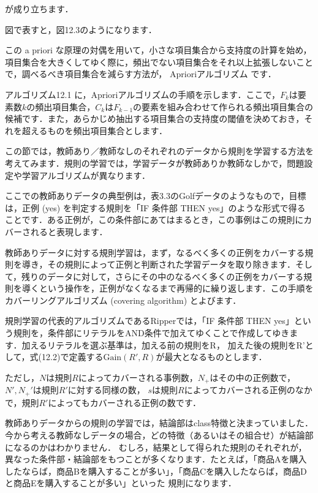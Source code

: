 が成り立ちます．


図で表すと，図12.3のようになります．


この a priori な原理の対偶を用いて，小さな項目集合から支持度の計算を始め，項目集合を大きくしてゆく際に，頻出でない項目集合をそれ以上拡張しないことで，調べるべき項目集合を減らす方法が，
Aprioriアルゴリズム
です．


アルゴリズム12.1 に，Aprioriアルゴリズムの手順を示します．ここで，$F_k$は要素数$k$の頻出項目集合，$C_k$は$F_{k-1}$の要素を組み合わせて作られる頻出項目集合の候補です．また，あらかじめ抽出する項目集合の支持度の閾値を決めておき，それを超えるものを頻出項目集合とします．



この節では，教師あり／教師なしのそれぞれのデータから規則を学習する方法を考えてみます．規則の学習では，学習データが教師ありか教師なしかで，問題設定や学習アルゴリズムが異なります．


ここでの教師ありデータの典型例は，表3.3のGolfデータのようなもので，目標は，正例 (yes) を判定する規則を「IF 条件部 THEN yes」のような形式で得ることです．ある正例が，この条件部にあてはまるとき，この事例はこの規則にカバーされると表現します．

教師ありデータに対する規則学習は，まず，なるべく多くの正例をカバーする規則を導き，その規則によって正例と判断された学習データを取り除きます．そして，残りのデータに対して，さらにその中のなるべく多くの正例をカバーする規則を導くという操作を，正例がなくなるまで再帰的に繰り返します．この手順を
カバーリングアルゴリズム
(covering algorithm) とよびます．

規則学習の代表的アルゴリズムであるRipperでは，「IF 条件部 THEN yes」という規則を，条件部にリテラルをAND条件で加えてゆくことで作成してゆきます．加えるリテラルを選ぶ基準は，加える前の規則をR，
加えた後の規則をR'として，式(12.2)で定義する$\mbox{Gain}(R', R)$が最大となるものとします．


ただし，$N$は規則$R$によってカバーされる事例数，$N_+$はその中の正例数で，$N', N_+'$は規則$R'$に対する同様の数，
$s$は規則$R$によってカバーされる正例のなかで，規則$R'$によってもカバーされる正例の数です．


教師ありデータからの規則の学習では，結論部はclass特徴と決まっていました．
今から考える教師なしデータの場合，どの特徴（あるいはその組合せ）が結論部になるのかはわかりません．
むしろ，結果として得られた規則のそれぞれが，異なった条件部・結論部をもつことが多くなります．たとえば，「商品Aを購入
したならば，商品Bを購入することが多い」，「商品Cを購入したならば，商品Dと商品Eを購入することが多い」といった
規則になります．


